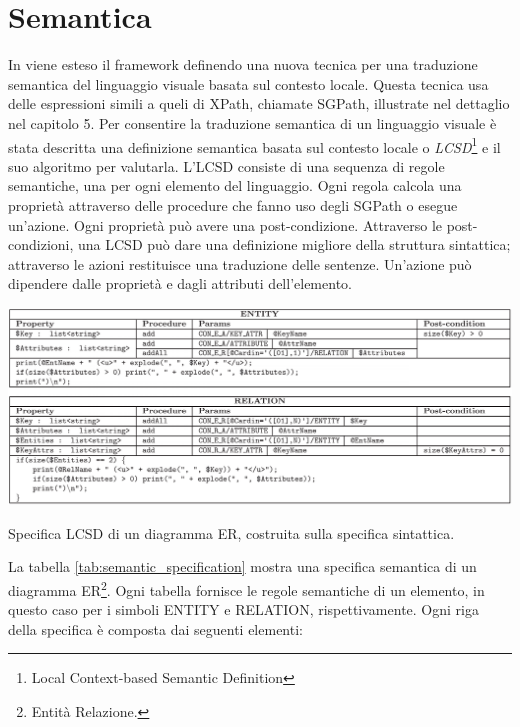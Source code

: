     \section{Semantica}
        \label{sec:semantica}
        In \cite{localcontext} viene esteso il framework definendo una nuova tecnica per una traduzione semantica del linguaggio visuale basata sul contesto locale. Questa tecnica usa delle espressioni simili a queli di XPath, chiamate SGPath, illustrate nel dettaglio nel capitolo 5.
        \newline
        Per consentire la traduzione semantica di un linguaggio visuale è stata descritta una definizione semantica basata sul contesto locale o \textit{LCSD}\footnote{Local Context-based Semantic Definition} e il suo algoritmo per valutarla. L'LCSD consiste di una sequenza di regole semantiche, una per ogni elemento del linguaggio. Ogni regola calcola una proprietà attraverso delle procedure che fanno uso degli SGPath o esegue un'azione. Ogni proprietà può avere una post-condizione.
        \newline
        Attraverso le post-condizioni, una LCSD può dare una definizione migliore della struttura sintattica; attraverso le azioni restituisce una traduzione delle sentenze. Un'azione può dipendere dalle proprietà e dagli attributi dell'elemento.
        \begin{table}[htbp]
            \centering
            \includegraphics[scale=0.37]{Figure/semantic_specification.PNG}
            \caption{Specifica LCSD di un diagramma ER, costruita sulla specifica sintattica.}
            \label{tab:semantic_specification}
        \end{table}
        \newline
        La tabella \ref{tab:semantic_specification} mostra una specifica semantica di un diagramma ER\footnote{Entità Relazione.}. Ogni tabella fornisce le regole semantiche di un elemento, in questo caso per i simboli ENTITY e RELATION, rispettivamente. Ogni riga della specifica è composta dai seguenti elementi:
